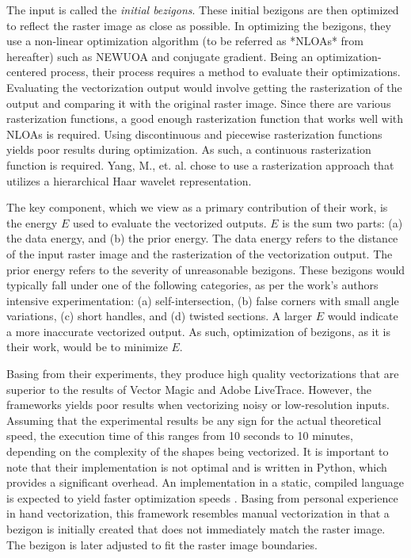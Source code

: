 The input is called the \textit{initial bezigons}. These initial bezigons are then optimized to reflect the raster image as close as possible. In optimizing the bezigons, they use a non-linear optimization algorithm (to be referred as *NLOAs* from hereafter) such as NEWUOA and conjugate gradient. Being an optimization-centered process, their process requires a method to evaluate their optimizations. Evaluating the vectorization output would involve getting the rasterization of the output and comparing it with the original raster image. Since there are various rasterization functions, a good enough rasterization function that works well with NLOAs is required. Using discontinuous and piecewise rasterization functions yields poor results during optimization. As such, a continuous rasterization function is required. Yang, M., et. al. chose to use a rasterization approach that utilizes a hierarchical Haar wavelet representation.

The key component, which we view as a primary contribution of their work, is the energy $E$ used to evaluate the vectorized outputs. $E$ is the sum two parts: (a) the data energy, and (b) the prior energy. The data energy refers to the distance of the input raster image and the rasterization of the vectorization output. The prior energy refers to the severity of unreasonable bezigons. These bezigons would typically fall under one of the following categories, as per the work's authors intensive experimentation: (a) self-intersection, (b) false corners with small angle variations, (c) short handles, and (d) twisted sections. A larger $E$ would indicate a more inaccurate vectorized output. As such, optimization of bezigons, as it is their work, would be to minimize $E$.

Basing from their experiments, they produce high quality vectorizations that are superior to the results of Vector Magic and Adobe LiveTrace. However, the frameworks yields poor results when vectorizing noisy or low-resolution inputs. Assuming that the experimental results be any sign for the actual theoretical speed, the execution time of this ranges from 10 seconds to 10 minutes, depending on the complexity of the shapes being vectorized. It is important to note that their implementation is not optimal and is written in Python, which provides a significant overhead. An implementation in a static, compiled language is expected to yield faster optimization speeds \cite{effectiveclipartimagevectorization}. Basing from personal experience in hand vectorization, this framework resembles manual vectorization in that a bezigon is initially created that does not immediately match the raster image. The bezigon is later adjusted to fit the raster image boundaries.

